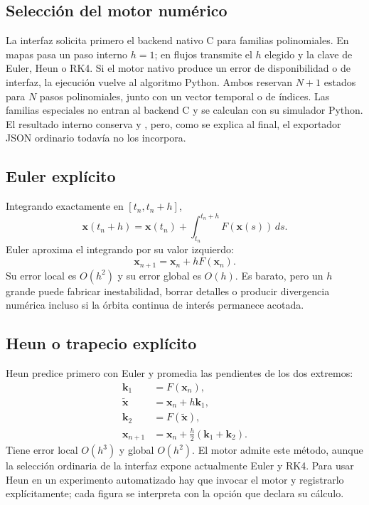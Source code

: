 \subsection{Selección del motor numérico}

La interfaz solicita primero el backend nativo C para familias polinomiales. En
mapas pasa un paso interno \(h=1\); en flujos transmite el \(h\) elegido y la clave
de Euler, Heun o RK4. Si el motor nativo produce un error de disponibilidad o de
interfaz, la ejecución vuelve al algoritmo Python. Ambos reservan \(N+1\) estados
para \(N\) pasos polinomiales, junto con un vector temporal o de índices. Las
familias especiales no entran al backend C y se calculan con su simulador Python.
El resultado interno conserva  y , pero,
como se explica al final, el exportador JSON ordinario todavía no los incorpora.

\subsection{Euler explícito}

Integrando exactamente en \([t_n,t_n+h]\),
\[
 \mathbf{x}(t_n+h)=\mathbf{x}(t_n)+
 \int_{t_n}^{t_n+h}F(\mathbf{x}(s))\,ds.
\]
Euler aproxima el integrando por su valor izquierdo:
\[
 \boxed{\mathbf{x}_{n+1}=\mathbf{x}_n+hF(\mathbf{x}_n)}.
\]
Su error local es \(O(h^2)\) y su error global es \(O(h)\). Es barato, pero un
\(h\) grande puede fabricar inestabilidad, borrar detalles o producir divergencia
numérica incluso si la órbita continua de interés permanece acotada.

\subsection{Heun o trapecio explícito}

Heun predice primero con Euler y promedia las pendientes de los dos extremos:
\[
\begin{aligned}
 \mathbf{k}_1&=F(\mathbf{x}_n),\\
 \widetilde{\mathbf{x}}&=\mathbf{x}_n+h\mathbf{k}_1,\\
 \mathbf{k}_2&=F(\widetilde{\mathbf{x}}),\\
 \boxed{\mathbf{x}_{n+1}}&=
 \mathbf{x}_n+\frac{h}{2}(\mathbf{k}_1+\mathbf{k}_2).
\end{aligned}
\]
Tiene error local \(O(h^3)\) y global \(O(h^2)\). El motor admite este método,
aunque la selección ordinaria de la interfaz expone actualmente Euler y RK4. Para
usar Heun en un experimento automatizado hay que invocar el motor y registrarlo
explícitamente; cada figura se interpreta con la opción que declara su cálculo.

